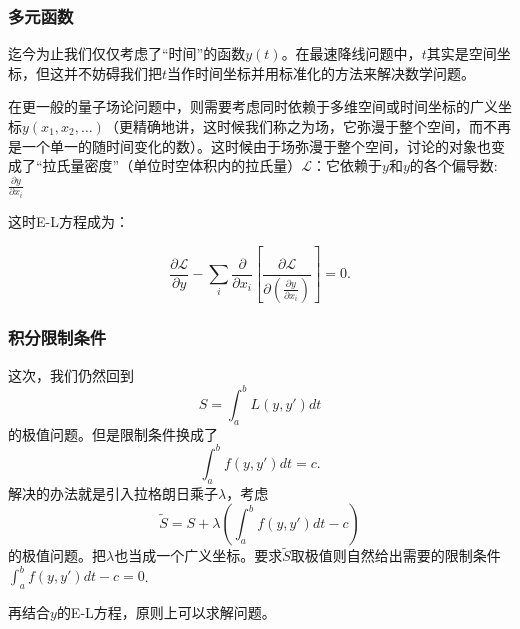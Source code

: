 \documentclass[CJK]{beamer}
\begin{document}
\begin{frame}
  \frametitle{多元函数}
  迄今为止我们仅仅考虑了“时间”的函数$y(t)$。在最速降线问题中，$t$其实是空间坐标，但这并不妨碍我们把$t$当作时间坐标并用标准化的方法来解决数学问题。

  在更一般的量子场论问题中，则需要考虑同时依赖于多维空间或时间坐标的广义坐标$y(x_1,x_2,\ldots)$（更精确地讲，这时候我们称之为场，它弥漫于整个空间，而不再是一个单一的随时间变化的数）。这时候由于场弥漫于整个空间，讨论的对象也变成了“拉氏量密度”（单位时空体积内的拉氏量）$\mathcal{L}$：它依赖于$y$和$y$的各个偏导数:
  $\frac{\partial y}{\partial x_i}$

  这时E-L方程成为：
  
  $$ \frac{\partial \mathcal{L}}{\partial y} - \sum_i\frac{\partial }{\partial x_i} \left[\frac{\partial \mathcal{L}}{\partial \left(\frac{\partial y}{\partial x_i}\right)}\right]=0.$$
\end{frame}


\begin{frame}
  \frametitle{积分限制条件}
  这次，我们仍然回到
  $$S = \int_a^b L(y, y')dt $$
  的极值问题。但是限制条件换成了
  $$ \int_a^b f(y,y') dt= c. $$
  解决的办法就是引入拉格朗日乘子$\lambda$，考虑
  $$ \widetilde{S} = S + \lambda\left(\int_a^b f(y,y') dt -c\right) $$
  的极值问题。把$\lambda$也当成一个广义坐标。要求$\widetilde{S}$取极值则自然给出需要的限制条件$\int_a^b f(y,y') dt -c = 0$.
  
  再结合$y$的E-L方程，原则上可以求解问题。
\end{frame}

\ech
\end{document}
